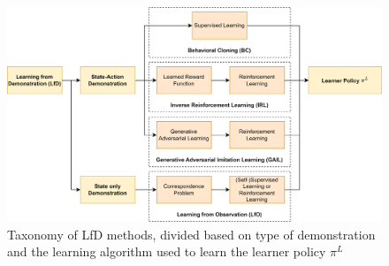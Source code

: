 \begin{figure}[t]
    \centering
    \includegraphics[width=\textwidth]{figures/images/il_taxonomy.png}
    \caption{Taxonomy of LfD methods, divided based on type of demonstration and the learning algorithm used to learn the learner policy $\pi^{L}$ }
    \label{fig:il_taxonomy}
    
\end{figure}
